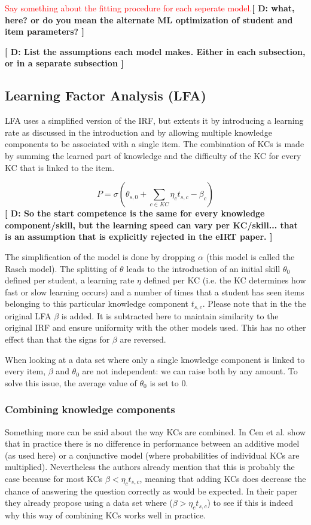 \documentclass{scrartcl}
\newcommand\todo[1]{\textcolor{red}{#1}}
\providecommand{\comm}[1]{{\bf[ #1 ]}}
\providecommand{\commd}[1]{\comm{D: {#1}}}
\begin{document}
\todo{Say something about the fitting procedure for each seperate model.}\commd{what, here? or do you mean the alternate ML optimization of student and item parameters? }

\commd{List the assumptions each model makes. Either in each subsection, or in a separate subsection}

\subsection{Learning Factor Analysis (LFA)}
\label{sec:LFA}


LFA uses a simplified version of the IRF, but extents it by introducing a learning rate as discussed in the introduction and by allowing multiple knowledge components to be associated with a single item. The combination of KCs is made by summing the learned part of knowledge and the difficulty of the KC for every KC that is linked to the item.

\begin{equation}
P = \sigma(\theta_{s,0} + \sum_{c \in KC}  \eta_{c} t_{s,c} - \beta_{c})
\end{equation}
\commd{So the start competence is the same for every knowledge component/skill, but the learning speed can vary per KC/skill... that is an assumption that is explicitly rejected in the eIRT paper.}

The simplification of the model is done by dropping $\alpha$ (this model is called the Rasch model). The splitting of $\theta$ leads to the introduction of an initial skill $\theta_{0}$ defined per student, a learning rate $\eta$ defined per KC (i.e. the KC determines how fast or slow learning occurs) and a number of times that a student has seen items belonging to this particular knowledge component $t_{s,c}$. Please note that in the the original LFA $\beta$ is added. It is subtracted here to maintain similarity to the original IRF and ensure uniformity with the other models used. This has no other effect than that the signs for $\beta$ are reversed.

When looking at a data set where only a single knowledge component is linked to every item, $\beta$ and $\theta_{0}$ are not independent: we can raise both by any amount. To solve this issue, the average value of $\theta_{0}$ is set to 0.
\subsubsection{Combining knowledge components}
\label{sec:comb}
Something more can be said about the way KCs are combined. In \cite{skillcombi} Cen et al. show that in practice there is no difference in performance between an additive model (as used here) or a conjunctive model (where probabilities of individual KCs are multiplied). Nevertheless the authors already mention that this is probably the case because for most KCs $\beta < \eta_{c} t_{s,c}$, meaning that adding KCs does decrease the chance of answering the question correctly as would be expected. In their paper they already propose using a data set where ($\beta > \eta_{c} t_{s,c}$) to see if this is indeed why this way of combining KCs works well in practice.
\end{document}
